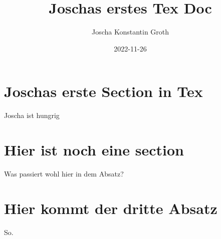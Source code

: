 \documentclass[a4paper]{article}
\title{Joschas erstes Tex Doc}
\author{Joscha Konstantin Groth}
\date{2022-11-26}
\begin{document}
\begin{titlepage}
    \maketitle
\end{titlepage}
\pagebreak
\tableofcontents
\pagebreak
\section{Joschas erste Section in Tex}
Joscha ist hungrig

\section{Hier ist noch eine section}
Was passiert wohl hier in dem Absatz?

\section{Hier kommt der dritte Absatz}
So.
\end{document}
